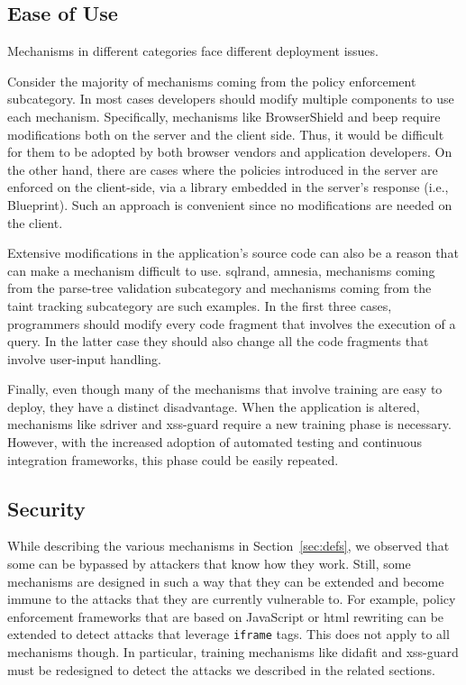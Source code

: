 \documentclass[conference]{IEEEtran}
\begin{document}
\subsection{Ease of Use}
\label{sec:deploy2}

Mechanisms in different categories face different deployment issues.

Consider the majority of mechanisms coming from the policy enforcement
subcategory. In most cases developers should modify multiple
components to use each mechanism. Specifically, mechanisms like
BrowserShield and {\sc beep} require modifications both on the server
and the client side. Thus, it would be difficult for them to be
adopted by both browser vendors and application developers. On the
other hand, there are cases where the policies introduced in the
server are enforced on the client-side, via a library embedded in the
server's response (i.e., Blueprint). Such an approach is convenient
since no modifications are needed on the client.

Extensive modifications in the application's source
code can also be a reason that can make a mechanism
difficult to use. {\sc sql}rand, {\sc amnesia},
mechanisms coming from the parse-tree validation
subcategory and mechanisms coming from the taint
tracking subcategory are such examples.
In the first three cases, programmers should modify every
code fragment that involves the execution of a query.
In the latter case they should also change
all the code fragments that involve user-input handling. 

Finally, even though many of the mechanisms that involve
training are easy to deploy, they have a distinct disadvantage.
When the application is altered, mechanisms like {\sc sd}river
and {\sc xss-guard} require a new training phase is necessary.
However, with the increased adoption of automated testing
and continuous integration frameworks, this phase could be
easily repeated.

\subsection{Security}

While describing the various mechanisms in Section~\ref{sec:defs}, we
observed that some can be bypassed by attackers that know how they
work. Still, some mechanisms are designed in such a way that they
can be extended and become immune to the attacks that they are
currently vulnerable to. For example, policy enforcement frameworks
that are based on JavaScript or {\sc html} rewriting can be extended
to detect attacks that leverage {\tt iframe} tags. This does not apply
to all mechanisms though. In particular, training mechanisms like {\sc
  didafit} and {\sc xss-guard} must be redesigned to detect the
attacks we described in the related sections.
\end{document}
